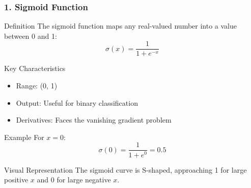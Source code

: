 \documentclass[aspectratio=169]{beamer}
\begin{document}
\begin{frame}[fragile]
    \frametitle{1. Sigmoid Function}
    \begin{block}{Definition}
        The sigmoid function maps any real-valued number into a value between 0 and 1:
        \begin{equation}
            \sigma(x) = \frac{1}{1 + e^{-x}}
        \end{equation}
    \end{block}
    
    \begin{block}{Key Characteristics}
        \begin{itemize}
            \item Range: (0, 1)
            \item Output: Useful for binary classification
            \item Derivatives: Faces the vanishing gradient problem
        \end{itemize}
    \end{block}

    \begin{block}{Example}
        For \( x = 0 \):
        \begin{equation}
            \sigma(0) = \frac{1}{1 + e^{0}} = 0.5
        \end{equation}
    \end{block}
    
    \begin{block}{Visual Representation}
        The sigmoid curve is S-shaped, approaching 1 for large positive \( x \) and 0 for large negative \( x \).
    \end{block}
\end{frame}
\end{document}
